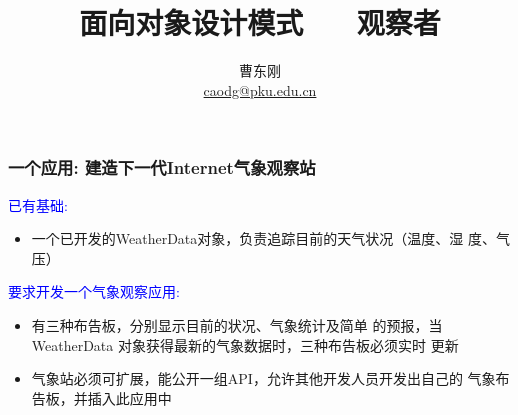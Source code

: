 \documentclass[compress]{beamer}
\begin{document}

					
\title[观察者模式]{面向对象设计模式 ~~ 观察者}

\author[曹东刚]
{曹东刚\\\href{mailto:caodg@pku.edu.cn}{caodg@pku.edu.cn}}


\date{}


\begin{frame}[plain]
	\titlepage
\end{frame}

\setcounter{framenumber}{0}


\begin{frame}
  \frametitle{一个应用: 建造下一代Internet气象观察站}

  \textcolor{blue}{已有基础:}
  \begin{itemize}
    \item 一个已开发的WeatherData对象，负责追踪目前的天气状况（温度、湿
      度、气压）
  \end{itemize}

  \textcolor{blue}{要求开发一个气象观察应用:}
  \begin{itemize}
    \item 有三种布告板，分别显示目前的状况、气象统计及简单
      的预报，当WeatherData 对象获得最新的气象数据时，三种布告板必须实时
      更新
    \item 气象站必须可扩展，能公开一组API，允许其他开发人员开发出自己的
      气象布告板，并插入此应用中
  \end{itemize}

\end{frame}
\end{document}
